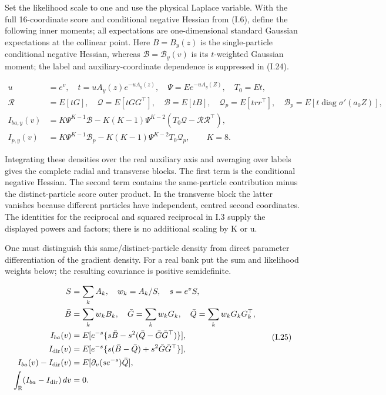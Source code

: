 \documentclass{article}
\begin{document}
Set the likelihood scale to one and use the physical Laplace variable.
With the full 16-coordinate score and conditional negative Hessian from
(I.6), define the following inner moments; all expectations are
one-dimensional standard Gaussian expectations at the collinear point.
Here \(B=B_y(z)\) is the single-particle conditional negative Hessian,
whereas \(\mathcal B=\mathcal B_y(v)\) is its \(t\)-weighted Gaussian
moment; the label and auxiliary-coordinate dependence is suppressed in
(I.24).

\[
\begin{aligned}
u&=e^v,\quad t=uA_y(z)e^{-uA_y(z)},\quad\Psi=E e^{-uA_y(Z)},\quad T_0=Et,\\
\mathcal R&=E[tG],\quad\mathcal Q=E[tGG^\top],\quad\mathcal B=E[tB],\quad
\mathcal Q_p=E[trr^\top],\quad\mathcal B_p=E[t\operatorname{diag}\sigma'(a_0Z)],\\
I_{ba,y}(v)&=K\Psi^{K-1}\mathcal B-K(K-1)\Psi^{K-2}(T_0\mathcal Q-\mathcal R\mathcal R^\top),\\
I_{p,y}(v)&=K\Psi^{K-1}\mathcal B_p-K(K-1)\Psi^{K-2}T_0\mathcal Q_p,\qquad K=8.
\end{aligned}
\tag{I.24}
\]

Integrating these densities over the real auxiliary axis and averaging
over labels gives the complete radial and transverse blocks. The first
term is the conditional negative Hessian. The second term contains the
same-particle contribution minus the distinct-particle score outer
product. In the transverse block the latter vanishes because different
particles have independent, centred second coordinates. The identities
for the reciprocal and squared reciprocal in I.3 supply the displayed
powers and factors; there is no additional scaling by K or u.

One must distinguish this same/distinct-particle density from direct
parameter differentiation of the gradient density. For a real bank put
the sum and likelihood weights below; the resulting covariance is
positive semidefinite.

\[
\begin{aligned}
S&=\sum_kA_k,\quad w_k=A_k/S,\quad s=e^vS,\\
\bar B&=\sum_kw_kB_k,\quad\bar G=\sum_kw_kG_k,\quad\bar Q=\sum_kw_kG_kG_k^\top,\\
I_{ba}(v)&=E[e^{-s}\{s\bar B-s^2(\bar Q-\bar G\bar G^\top)\}],\\
I_{\rm dir}(v)&=E[e^{-s}\{s(\bar B-\bar Q)+s^2\bar G\bar G^\top\}],\\
I_{ba}(v)-I_{\rm dir}(v)&=E[\partial_v(se^{-s})\bar Q],\\
\int_{\mathbb R}(I_{ba}-I_{\rm dir})\,dv&=0.
\end{aligned}
\tag{I.25}
\]
\end{document}

